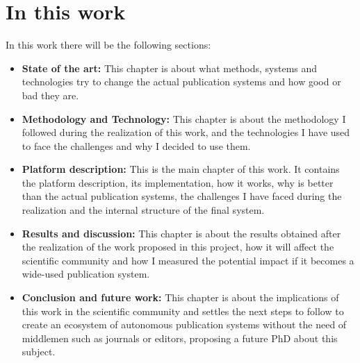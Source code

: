   \section{In this work}
  In this work there will be the following sections:
  \begin{itemize}
  \item \textbf{State of the art:} This chapter is about what methods, systems
    and technologies try to change the actual publication systems and how good
    or bad they are.
  \item \textbf{Methodology and Technology:} This chapter is about the
    methodology I followed during the realization of this work, and the
    technologies I have used to face the challenges and why I decided to use
    them.
  \item \textbf{Platform description:} This is the main chapter of this work. It
    contains the platform description, its implementation, how it works, why is
    better than the actual publication systems, the challenges I have faced
    during the realization and the internal structure of the final system.
  \item \textbf{Results and discussion:} This chapter is about the results
    obtained after the realization of the work proposed in this project, how it
    will affect the scientific community and how I measured the potential impact
    if it becomes a wide-used publication system.
  \item \textbf{Conclusion and future work:} This chapter is about the
    implications of this work in the scientific community and settles the next
    steps to follow to create an ecosystem of autonomous publication systems
    without the need of middlemen such as journals or editors, proposing a
    future PhD about this subject.
  \end{itemize}



